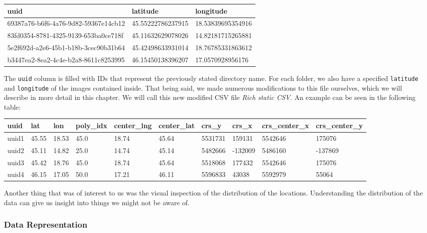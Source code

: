 \documentclass[]{article}
\let\oldtexttt\texttt
\renewcommand{\texttt}[1]{
  \textcolor{tcolor}{\colorbox{bgcolor}{\oldtexttt{#1}}}
}
\begin{document}
\begin{longtable}[]{@{}lll@{}}
\toprule
uuid & latitude & longitude\tabularnewline
\midrule
\endhead
69387a76-b6f6-4a76-9d82-59367e14cb12 & 45.55222786237915 &
18.53839695354916\tabularnewline
83fd0354-8781-4325-9139-653ba0ce718f & 45.11632629078026 &
14.82181715265881\tabularnewline
5e2f692d-a2e6-45b1-b18b-3cec90b31b64 & 45.42498633931014 &
18.76785331863612\tabularnewline
b3447ea2-8ea2-4c4e-b2a8-8611c8253995 & 46.15450138396207 &
17.0570928956176\tabularnewline
\bottomrule
\end{longtable}

The \texttt{uuid} column is filled with IDs that represent the
previously stated directory name. For each folder, we also have a
specified \texttt{latitude} and \texttt{longitude} of the images
contained inside. That being said, we made numerous modifications to
this file ourselves, which we will describe in more detail in this
chapter. We will call this new modified CSV file \emph{Rich static CSV}.
An example can be seen in the following table:

\begin{longtable}[]{@{}llllllllll@{}}
\toprule
uuid & lat & lon & poly\_idx & center\_lng & center\_lat & crs\_y &
crs\_x & crs\_center\_x & crs\_center\_y\tabularnewline
\midrule
\endhead
uuid1 & 45.55 & 18.53 & 45.0 & 18.74 & 45.64 & 5531731 & 159131 &
5542646 & 175076\tabularnewline
uuid2 & 45.11 & 14.82 & 25.0 & 14.74 & 45.14 & 5482666 & -132009 &
5486160 & -137869\tabularnewline
uuid3 & 45.42 & 18.76 & 45.0 & 18.74 & 45.64 & 5518068 & 177432 &
5542646 & 175076\tabularnewline
uuid4 & 46.15 & 17.05 & 50.0 & 17.21 & 46.11 & 5596833 & 43038 & 5592979
& 55064\tabularnewline
\bottomrule
\end{longtable}

Another thing that was of interest to us was the visual inspection of
the distribution of the locations. Understanding the distribution of the
data can give us insight into things we might not be aware of.

\hypertarget{data-representation}{%
\subsubsection{Data Representation}\label{data-representation}}
\end{document}
